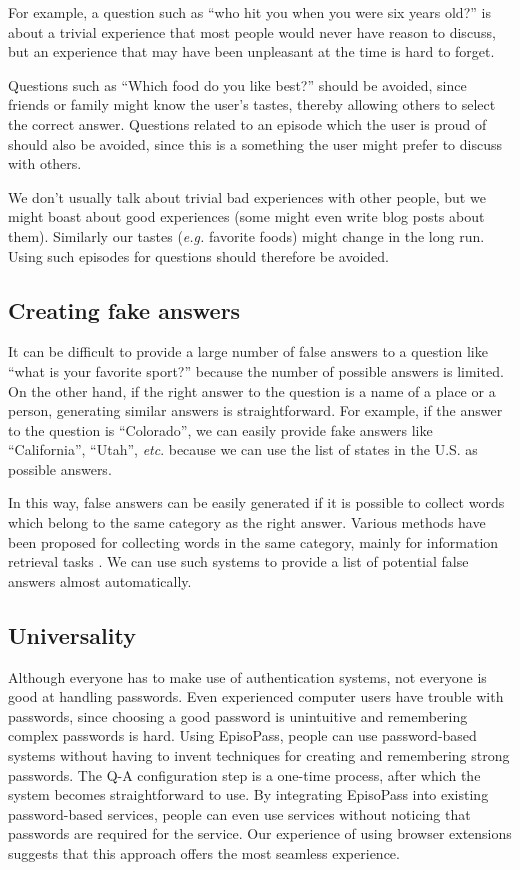 \documentclass[runningheads,a4paper]{llncs}
\begin{document}
For example, a question such as
``who hit you when you were six years old?''
is about a trivial experience that most people would never have reason to discuss,
but an experience that may have been unpleasant at the time is hard to forget.

Questions such as ``Which food do you like best?'' should be avoided,
since friends or family might know the user's tastes, thereby allowing 
others to select the correct answer.
Questions related to an episode which the user is proud of should also be
avoided, since this is a something the user might prefer to discuss with others.

We don't usually talk about trivial bad experiences with other people,
but we might boast about good experiences (some might even write blog posts about them).
Similarly our tastes ({\it e.g.\/} favorite foods) might change in the long run.
Using such episodes for questions should therefore be avoided.

\subsection{Creating fake answers}

It can be difficult to provide a large number of false answers to a question like
``what is your favorite sport?''
because the number of possible answers is limited.
%
On the other hand, if the right answer to the question is a name of a place or a person,
generating similar answers is straightforward.
For example, if the answer to the question is ``Colorado'',
we can easily provide fake answers like ``California'', ``Utah'', {\it etc}.
because we can use the list of states in the U.S. as possible answers.

In this way, false answers can be easily generated
if it is possible to collect words which belong to the same
category as the right answer.
%
Various methods have been proposed for collecting words in the
same category, mainly for information retrieval tasks
\cite{Huang:2012:LFC:2426725.2426728,BooWa,Wang:2007:LSE:1441428.1442086}. %
We can use such systems to provide a list of potential false answers almost automatically.

\subsection{Universality}

Although everyone has to make use of authentication systems, not everyone
is good at handling passwords.
Even experienced computer users have trouble with passwords,
since choosing a good password is unintuitive and remembering complex
passwords is hard.
%
Using EpisoPass, people can use password-based systems without having to invent
techniques for creating and remembering strong passwords. The Q-A configuration step
is a one-time process, after which the system becomes straightforward to use.
%
By integrating EpisoPass into existing password-based services,
people can even use services without noticing that passwords are
required for the service.
%
Our experience of using browser extensions suggests that
this approach offers the most seamless experience.
\end{document}

